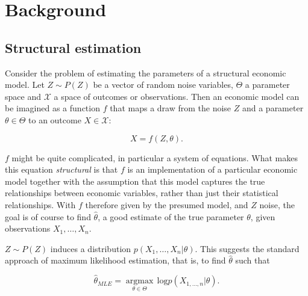 
\section{Background} %
\label{sec:background}

\subsection{Structural estimation}
\label{sec:structural_estimation}

Consider the problem of estimating the parameters of a structural economic model.
Let $Z \sim P(Z)$ be a vector of random noise variables, $\Theta$ a parameter space and $\mathcal{X}$ a space of outcomes or observations.
Then an economic model can be imagined as a function $f$ that maps a draw from the noise $Z$ and a parameter $\theta \in \Theta$ to an outcome $X \in \mathcal{X}$:

\begin{equation}
    X = f(Z, \theta).
\end{equation}

$f$ might be quite complicated, in particular a system of equations.
What makes this equation \textit{structural} is that $f$ is an implementation of a particular economic model together with the assumption that this model captures the true relationships between economic variables, rather than just their statistical relationships. %
With $f$ therefore given by the presumed model, and $Z$ noise, the goal is of course to find $\hat{\theta}$, a good estimate of the true parameter $\theta$, given observations $X_1, \dots, X_n$.

$Z \sim P(Z)$ induces a distribution $p(X_1, \dots, X_n|\theta)$.
This suggests the standard approach of maximum likelihood estimation, that is, to find $\hat{\theta}$ such that

\begin{equation}
    \hat{\theta}_{MLE} = \underset{\theta\in\Theta}{\operatorname{\arg \max}}\,\text{log} p(X_{1, \dots, n}|\theta).
\end{equation}

